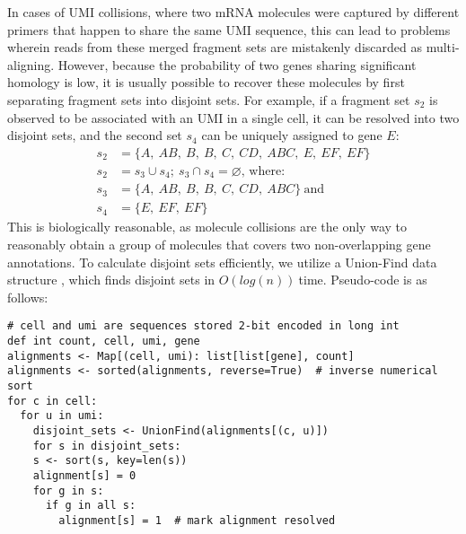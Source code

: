 In cases of UMI collisions, where two mRNA molecules were captured by different primers that happen to share the same UMI sequence, this can lead to problems wherein reads from these merged fragment sets are mistakenly discarded as multi-aligning. 
However, because the probability of two genes sharing significant homology is low, it is usually possible to recover these molecules by first separating fragment sets into disjoint sets. 
For example, if a fragment set $s_2$ is observed to be associated with an UMI in a single cell, it can be resolved into two disjoint sets, and the second set $s_4$ can be uniquely assigned to gene $E$: 
\begin{align*}
  s_{2} & = \{ A,\ AB,\ B,\ B,\ C,\ CD,\ ABC,\ E,\ EF,\ EF\} \\
  s_{2} & = s_{3} \cup s_{4};\ s_{3} \cap s_{4} = \varnothing \text{, where}: \\
  s_{3} & = \{ A,\ AB,\ B,\ B,\ C,\ CD,\ ABC\}\ \text{and} \\ 
  s_{4} & = \{ E,\ EF,\ EF\}
\end{align*}
This is biologically reasonable, as molecule collisions are the only way to reasonably obtain a group of molecules that covers two non-overlapping gene annotations.
To calculate disjoint sets efficiently, we utilize a Union-Find data structure \citep{Aho1983}, which finds disjoint sets in \(O(log(n))\ \)time. 
Pseudo-code is as follows:

\begin{verbatim}
# cell and umi are sequences stored 2-bit encoded in long int
def int count, cell, umi, gene
alignments <- Map[(cell, umi): list[list[gene], count]
alignments <- sorted(alignments, reverse=True)  # inverse numerical sort
for c in cell:
  for u in umi:
    disjoint_sets <- UnionFind(alignments[(c, u)])
    for s in disjoint_sets:
    s <- sort(s, key=len(s))
    alignment[s] = 0
    for g in s:
      if g in all s:
        alignment[s] = 1  # mark alignment resolved
\end{verbatim}

